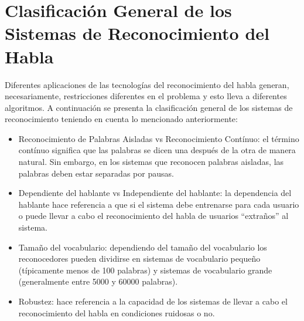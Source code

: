 \section{Clasificaci\'on General de los Sistemas de Reconocimiento del Habla}

Diferentes aplicaciones de las tecnolog\'ias del reconocimiento del habla generan, necesariamente, 
restricciones diferentes en el problema y esto lleva a diferentes algoritmos\cite{Jurafsky}. A continuaci\'on se presenta
la clasificaci\'on general de los sistemas de reconocimiento teniendo en cuenta lo mencionado anteriormente:

\begin{itemize}
    \item Reconocimiento de Palabras Aisladas vs Reconocimiento Cont\'inuo: el t\'ermino cont\'inuo significa
        que las palabras se dicen una despu\'es de la otra de manera natural. Sin embargo, en los sistemas
        que reconocen palabras aisladas, las palabras deben estar separadas por pausas.
    \item Dependiente del hablante vs Independiente del hablante: la dependencia del hablante hace referencia
        a que si el sistema debe entrenarse para cada usuario o puede llevar a cabo el reconocimiento del habla
        de usuarios ``extra\~nos'' al sistema.
    \item Tama\~no del vocabulario: dependiendo del tama\~no del vocabulario los reconocedores pueden dividirse
        en sistemas de vocabulario peque\~no (t\'ipicamente menos de 100 palabras) y sistemas de vocabulario grande (generalmente
        entre 5000 y 60000 palabras).
    \item Robustez: hace referencia a la capacidad de los sistemas de llevar a cabo el 
        reconocimiento del habla en condiciones ruidosas o no.
\end{itemize}